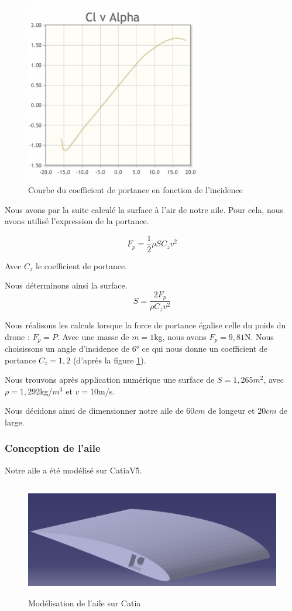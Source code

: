 \documentclass[a4paper,12pt,french]{report}
\begin{document}
\begin{figure}[h]
    \centering
    \includegraphics[height=8cm]{figures/cz.png}
    \caption{Courbe du coefficient de portance en fonction de l'incidence}
    \label{cz}
\end{figure}

Nous avons par la suite calculé la surface à l'air de notre aile. Pour cela, nous avons utilisé l'expression de la portance.

$$ F_p=\frac{1}{2}\rho S C_z v^2$$

Avec $C_z$ le coefficient de portance.

Nous déterminons ainsi la surface.
$$S=\frac{2F_p}{\rho C_z v^2}$$

Nous réalisons les calculs lorsque la force de portance égalise celle du poids du drone : $F_p=P.$ Avec une masse de $m=1$kg, nous avons $F_p=9,81$N. Nous choisissons un angle d'incidence de $6°$ ce qui nous donne un coefficient de portance $C_z=1,2$ (d'après la figure \ref{cz}).\newline

Nous trouvons après application numérique une surface de $S=1,265$$m^2$, avec $\rho=1,292$kg/$m^3$ et $v=10$m/s.\newline

    Nous décidons ainsi de dimensionner notre aile de $60cm$ de longeur et $20cm$ de large.

\subsubsection*{Conception de l'aile}

Notre aile a été modélisé sur CatiaV5.

\begin{figure}[h]
    \centering
    \includegraphics[height=5cm]{figures/ailec.png}
    \caption{Modélisation de l'aile sur Catia}
    \label{aile}
\end{figure}
\end{document}
